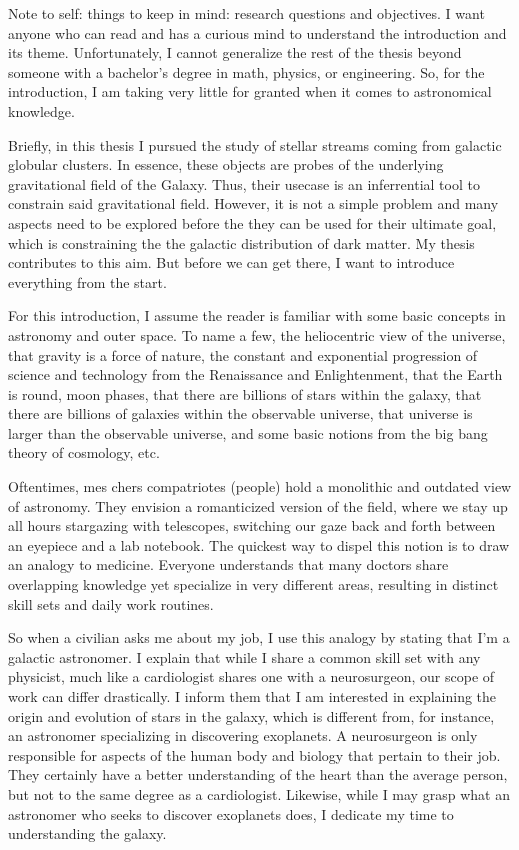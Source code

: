 Note to self: things to keep in mind: research questions and objectives. I want anyone who can read and has a curious mind to understand the introduction and its theme. Unfortunately, I cannot generalize the rest of the thesis beyond someone with a bachelor's degree in math, physics, or engineering. So, for the introduction, I am taking very little for granted when it comes to astronomical knowledge. 

Briefly, in this thesis I pursued the study of stellar streams coming from galactic globular clusters. In essence, these objects are probes of the underlying gravitational field of the Galaxy. Thus, their usecase is an inferrential tool to constrain said gravitational field. However, it is not a simple problem and many aspects need to be explored before the they can be used for their ultimate goal, which is constraining the the galactic distribution of dark matter. My thesis contributes to this aim. But before we can get there, I want to introduce everything from the start. 

For this introduction, I assume the reader is familiar with some basic concepts in astronomy and outer space. To name a few, the heliocentric view of the universe, that gravity is a force of nature, the constant and exponential progression of science and technology from the Renaissance and Enlightenment, that the Earth is round, moon phases, that there are billions of stars within the galaxy, that there are billions of galaxies within the observable universe, that universe is larger than the observable universe, and some basic notions from the big bang theory of cosmology, etc. 

Oftentimes, mes chers compatriotes (people) hold a monolithic and outdated view of astronomy. They envision a romanticized version of the field, where we stay up all hours stargazing with telescopes, switching our gaze back and forth between an eyepiece and a lab notebook. The quickest way to dispel this notion is to draw an analogy to medicine. Everyone understands that many doctors share overlapping knowledge yet specialize in very different areas, resulting in distinct skill sets and daily work routines. 

So when a civilian asks me about my job, I use this analogy by stating that I'm a galactic astronomer. I explain that while I share a common skill set with any physicist, much like a cardiologist shares one with a neurosurgeon, our scope of work can differ drastically.  I inform them that I am interested in explaining the origin and evolution of stars in the galaxy, which is different from, for instance, an astronomer specializing in discovering exoplanets. A neurosurgeon is only responsible for aspects of the human body and biology that pertain to their job. They certainly have a better understanding of the heart than the average person, but not to the same degree as a cardiologist. Likewise, while I may grasp what an astronomer who seeks to discover exoplanets does, I dedicate my time to understanding the galaxy. 

